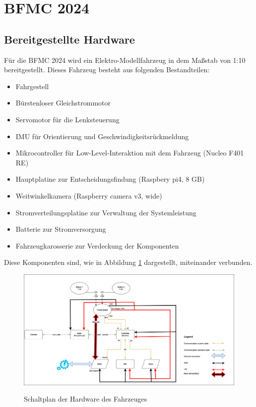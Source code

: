 \newpage

\section{BFMC 2024}

\subsection{Bereitgestellte Hardware}

Für die \gls{BFMC} 2024 wird ein Elektro-Modellfahrzeug in dem Maßstab von 1:10 bereitgestellt. Dieses Fahrzeug besteht aus folgenden Bestandteilen: \cite{bosch_bfmc_competition_regulation}
\begin{itemize}
    \item Fahrgestell
    \item Bürstenloser Gleichstrommotor
    \item Servomotor für die Lenksteuerung
    \item \gls{IMU} für Orientierung und Geschwindigkeitsrückmeldung
    \item Mikrocontroller für Low-Level-Interaktion mit dem Fahrzeug (Nucleo F401 RE)
    \item Hauptplatine zur Entscheidungsfindung (Raspbery pi4, 8 GB)
    \item Weitwinkelkamera (Raspberry camera v3, wide)
    \item Stromverteilungsplatine zur Verwaltung der Systemleistung
    \item Batterie zur Stromversorgung
    \item Fahrzeugkarosserie zur Verdeckung der Komponenten
\end{itemize}

Diese Komponenten sind, wie in Abbildung \ref{fig:schaltplanFahrzeug} dargestellt, miteinander verbunden. 
\begin{figure}[H]
    \centering
    \includegraphics[width=1\linewidth]{Pictures/ConnectionDiagram.png}
    \caption{Schaltplan der Hardware des Fahrzeuges}
    \cite{bosch_bfmc_competition_documentation}
    \label{fig:schaltplanFahrzeug}
\end{figure}

